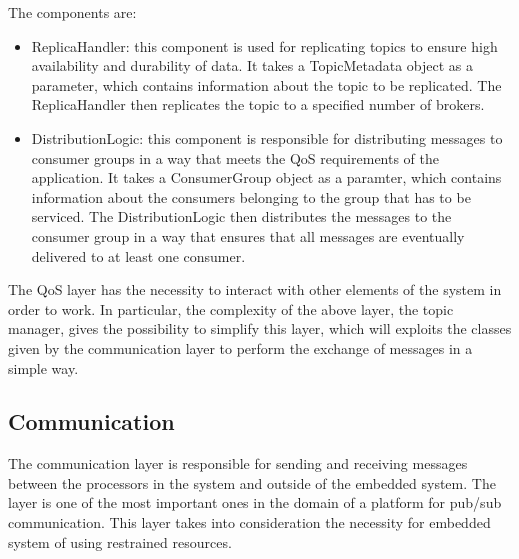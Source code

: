The components are:

\begin{itemize}
    \item   ReplicaHandler: this component is used for replicating topics to
            ensure high availability and durability of data. It takes a
            TopicMetadata object as a parameter, which contains information
            about the topic to be replicated. The ReplicaHandler then
            replicates the topic to a specified number of brokers.
    \item   DistributionLogic: this component is responsible for distributing
            messages to consumer groups in a way that meets the QoS
            requirements of the application. It takes a ConsumerGroup object
            as a paramter, which contains information about the consumers
            belonging to the group that has to be serviced.
            The DistributionLogic then distributes the messages to the consumer
            group in a way that ensures that all messages are eventually
            delivered to at least one consumer.
\end{itemize}

The QoS layer has the necessity to interact with other elements of the system
in order to work. In particular, the complexity of the above layer, the topic
manager, gives the possibility to simplify this layer, which will exploits
the classes given by the communication layer to perform the exchange of
messages in a simple way.

\subsection{Communication}

The communication layer is responsible for sending and receiving messages
between the processors in the system and outside of the embedded system.
The layer is one of the most important ones in the domain of a
platform for pub/sub communication. This layer takes into consideration the
necessity for embedded system of using restrained resources.

